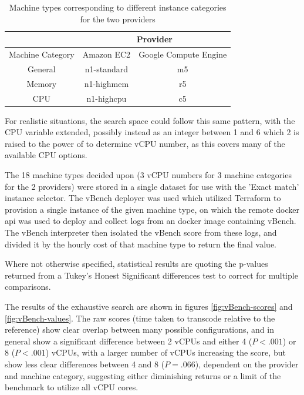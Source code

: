 \documentclass{article}
\begin{document}
\begin{table}
\begin{tabular}{ |c||c|c|  }
 \hline
 & \multicolumn{2}{|c|}{Provider} \\
 \hline
 Machine Category & Amazon EC2 & Google Compute Engine \\
 \hline
 General& n1-standard & m5\\
 Memory & n1-highmem  & r5\\
 CPU    & n1-highcpu  & c5\\
 \hline
\end{tabular}
\caption{Machine types corresponding to different instance categories for the two providers}
\label{tab:instance-types}
\end{table}

For realistic situations, the search space could follow this same pattern, with the CPU variable extended, possibly instead as an integer between 1 and 6 which 2 is raised to the power of to determine vCPU number, as this covers many of the available CPU options.

The 18 machine types decided upon (3 vCPU numbers for 3 machine categories for the 2 providers) were stored in a single dataset for use with the 'Exact match' instance selector. The vBench deployer was used which utilized Terraform to provision a single instance of the given machine type, on which the remote docker api was used to deploy and collect logs from an docker image containing vBench. The vBench interpreter then isolated the vBench score from these logs, and divided it by the hourly cost of that machine type to return the final value.

Where not otherwise specified, statistical results are quoting the p-values returned from a Tukey's Honest Significant differences test to correct for multiple comparisons.

The results of the exhaustive search are shown in figures \ref{fig:vBench-scores} and \ref{fig:vBench-values}. The raw scores (time taken to transcode relative to the reference) show clear overlap between many possible configurations, and in general show a significant difference between 2 vCPUs and either 4 ($P < .001$) or 8 ($P < .001$) vCPUs, with a larger number of vCPUs increasing the score, but show less clear differences between 4 and 8 ($P = .066$), dependent on the provider and machine category, suggesting either diminishing returns or a limit of the benchmark to utilize all vCPU cores.
 
\end{document}
